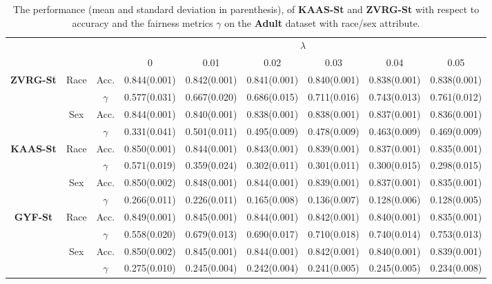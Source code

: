 \documentclass[11pt]{article}
\begin{document}
	
	\begin{table}[t]
		\centering
		\caption{The performance (mean and standard deviation in parenthesis), of \textbf{KAAS-St} and \textbf{ZVRG-St} with respect to accuracy and the fairness metrics  $\gamma$ on the \textbf{Adult} dataset with race/sex attribute.
		} 
		{\fontsize{7}{8} \selectfont
			\begin{tabular}{|*{9}{c|}} \hline
				& & & \multicolumn{6}{|c|}{$\lambda$}  \tabularnewline \cline{4-9}			
				& & & 0 & 0.01 & 0.02 & 0.03 & 0.04 & 0.05  \tabularnewline \hline
				\multirow{4}{*}{\textbf{ZVRG-St}} & \multirow{2}{*}{Race} & Acc. & 0.844(0.001) & 0.842(0.001) & 0.841(0.001) & 0.840(0.001) & 0.838(0.001) & 0.838(0.001) \tabularnewline \cline{3-9}
				& & $\gamma$  & 0.577(0.031) & 0.667(0.020) & 0.686(0.015) & 0.711(0.016) & 0.743(0.013) & 0.761(0.012) \tabularnewline  \cline{2-9}
				& \multirow{2}{*}{Sex} & Acc. & 0.844(0.001) & 0.840(0.001) & 0.838(0.001) & 0.838(0.001) & 0.837(0.001) & 0.836(0.001) \tabularnewline \cline{3-9}
				& & $\gamma$  & 0.331(0.041) & 0.501(0.011) & 0.495(0.009) & 0.478(0.009) & 0.463(0.009) & 0.469(0.009) \tabularnewline  \hline
				\multirow{4}{*}{\textbf{KAAS-St}} & \multirow{2}{*}{Race} & Acc. & 0.850(0.001) & 0.844(0.001) & 0.843(0.001) & 0.839(0.001) & 0.837(0.001) & 0.835(0.001) \tabularnewline \cline{3-9}
				& & $\gamma$  & 0.571(0.019) & 0.359(0.024) & 0.302(0.011) & 0.301(0.011) & 0.300(0.015) & 0.298(0.015) \tabularnewline  \cline{2-9}
				& \multirow{2}{*}{Sex} & Acc. & 0.850(0.002) & 0.848(0.001) & 0.844(0.001) & 0.839(0.001) & 0.837(0.001) & 0.835(0.001) \tabularnewline \cline{3-9}
				& & $\gamma$ & 0.266(0.011) & 0.226(0.011) & 0.165(0.008) & 0.136(0.007) & 0.128(0.006) & 0.128(0.005) \tabularnewline  \hline
				\multirow{4}{*}{\textbf{GYF-St}} & \multirow{2}{*}{Race} & Acc. & 0.849(0.001) & 0.845(0.001) & 0.844(0.001) & 0.842(0.001) & 0.840(0.001) & 0.835(0.001) \tabularnewline \cline{3-9}
				& & $\gamma$  & 0.558(0.020) & 0.679(0.013) & 0.690(0.017) & 0.710(0.018) & 0.740(0.014) & 0.753(0.013) \tabularnewline  \cline{2-9}
				& \multirow{2}{*}{Sex} & Acc. & 0.850(0.002) & 0.845(0.001) & 0.844(0.001) & 0.842(0.001) & 0.840(0.001) & 0.839(0.001) \tabularnewline \cline{3-9}
				& & $\gamma$ & 0.275(0.010) & 0.245(0.004) & 0.242(0.004) & 0.241(0.005) & 0.245(0.005) & 0.234(0.008) \tabularnewline  \hline
			\end{tabular}
		}
		
		\label{tab:acc}
	\end{table}
\end{document}
